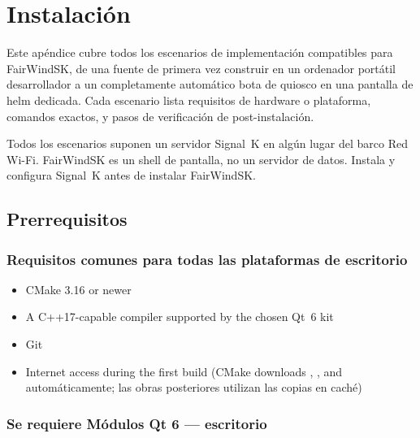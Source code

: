 \chapter{Instalación}
\label{app:installation}

Este apéndice cubre todos los escenarios de implementación compatibles para FairWindSK,
de una fuente de primera vez construir en un ordenador portátil desarrollador a un completamente automático
bota de quiosco en una pantalla de helm dedicada.
Cada escenario lista requisitos de hardware o plataforma, comandos exactos,
y pasos de verificación de post-instalación.

\begin{notebox}
Todos los escenarios suponen un servidor Signal~K en algún lugar del barco
Red Wi-Fi.
FairWindSK es un shell de pantalla, no un servidor de datos.
Instala y configura Signal~K antes de instalar FairWindSK.
\end{notebox}

\section{Prerrequisitos}
\label{app:prerequisites}

\subsection{Requisitos comunes para todas las plataformas de escritorio}

\begin{itemize}
  \item CMake 3.16 or newer
  \item A C++17-capable compiler supported by the chosen Qt~6 kit
  \item Git
  \item Internet access during the first build
        (CMake downloads , , and 
automáticamente; las obras posteriores utilizan las copias en caché)
\end{itemize}

\subsection{Se requiere Módulos Qt 6 --- escritorio}


